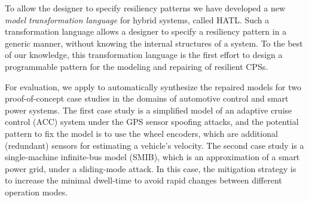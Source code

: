 %
%
To allow the designer to specify resiliency patterns we have developed a new \emph{model transformation language} for hybrid systems, called HATL.
%
Such a transformation language allows a designer to specify a resiliency pattern in a generic manner, without knowing the internal structures of a system. To the best of our knowledge, this transformation language is the first effort to design a programmable pattern for the modeling and repairing of resilient CPSs. 
%

For evaluation, we apply \toolreaffirm to automatically synthesize the repaired models for two proof-of-concept case studies in the domains of automotive control and smart power systems. The first case study is a simplified model of an adaptive cruise control (ACC) system under the GPS sensor spoofing attacks, and the potential pattern to fix the model is to use the wheel encoders, which are additional (redundant) sensors for estimating a vehicle's velocity. The second case study is a single-machine infinite-bus model (SMIB), which is an approximation of a smart power grid, under a sliding-mode attack. In this case, the mitigation strategy is to increase the minimal dwell-time to avoid rapid changes between different operation modes. 


